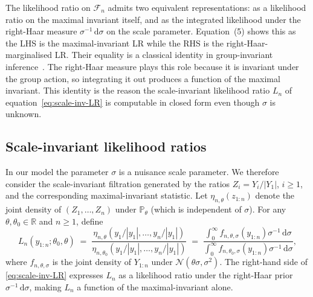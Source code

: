 \documentclass{article}%
\newcommand{\Prob}{\mathbb{P}}
\newcommand{\dd}{\,\mathrm{d}}
\newcommand{\1}{\mathbf{1}}
\begin{document}
The likelihood ratio on \(\mathcal{F}_n\) admits two equivalent
representations: as a likelihood ratio on the maximal invariant
itself, and as the integrated likelihood under the right-Haar measure
\(\sigma^{-1}\dd\sigma\) on the scale parameter. Equation~(5) shows this as the LHS is the maximal-invariant LR while the RHS is the
right-Haar-marginalised LR. Their equality is a classical identity in
group-invariant inference~\citep{eaton1989group, lehmann2005testing}. The right-Haar measure
plays this role because it is invariant under the group action, so
integrating it out produces a function of the maximal invariant. This
identity is the reason the scale-invariant likelihood ratio \(L_n\) of
equation~\eqref{eq:scale-inv-LR} is computable in closed form even though \(\sigma\) is unknown.


\subsection{Scale-invariant likelihood ratios}\label{ssec:scale-inv}

In our model the parameter \(\sigma\) is a nuisance scale parameter.
We therefore consider the scale-invariant filtration generated by the
ratios \(Z_i=Y_i/|Y_1|\), \(i\geq 1\), and the corresponding
maximal-invariant statistic. Let
\(\eta_{n,\theta}(z_{1:n})\) denote the joint density of
\((Z_1,\ldots,Z_n)\) under \(\Prob_\theta\) (which is independent of
\(\sigma\)). For any \(\theta,\theta_0\in\mathbb{R}\) and \(n\geq 1\), define
\begin{equation}\label{eq:scale-inv-LR}
  L_n(y_{1:n};\theta_0,\theta)
  \;=\;\frac{\eta_{n,\theta}(y_1/|y_1|,\ldots,y_n/|y_1|)}
            {\eta_{n,\theta_0}(y_1/|y_1|,\ldots,y_n/|y_1|)}
  \;=\;\frac{\int_0^\infty f_{n,\theta,\sigma}(y_{1:n})\sigma^{-1}\dd\sigma}
            {\int_0^\infty f_{n,\theta_0,\sigma}(y_{1:n})\sigma^{-1}\dd\sigma},
\end{equation}
where \(f_{n,\theta,\sigma}\) is the joint density of \(Y_{1:n}\)
under \(\mathcal N(\theta\sigma,\sigma^2)\). The right-hand side of
\eqref{eq:scale-inv-LR} expresses \(L_n\) as a likelihood ratio under
the right-Haar prior \(\sigma^{-1}\dd\sigma\), making \(L_n\) a
function of the maximal-invariant alone.
\end{document}
